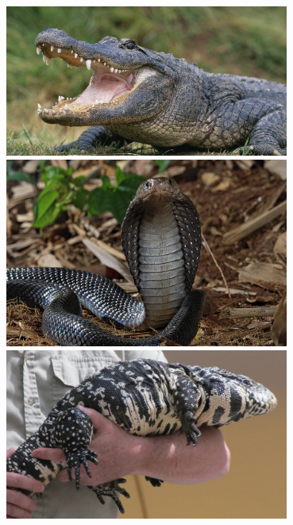 \documentclass[10pt]{beamer}
\begin{document}
\begin{frame}[t]
\begin{columns}[t]
		\begin{column}{0.4\textwidth}
			\begin{center}
				\includegraphics[width=0.7\textwidth]{figures/alligator.jpg}\\
				\vspace{0.25cm}
				\includegraphics[width=0.7\textwidth]{figures/cobra.jpg}\\
				\vspace{0.25cm}
				\includegraphics[width=0.7\textwidth]{figures/tegu.jpg}
			\end{center}
		\end{column}
	\end{columns}
		
\end{frame}
\end{document}
